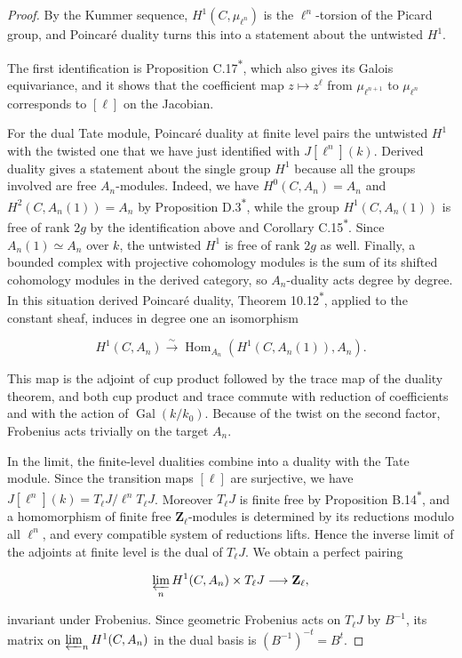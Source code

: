 \documentclass[11pt]{article}
\newcommand{\bpout}[1]{#1\textsuperscript{\hyperlink{bp-outside}{\ensuremath{\ast}}}}
\providecommand{\Hom}{}\renewcommand{\Hom}{\operatorname{Hom}}
\begin{document}
\begin{proof}[{Proof}]\label{bp49}%
By the Kummer sequence, \(H^1(C,\mu_{\ell^n})\) is the \(\ell^n\)-torsion of the Picard group, and Poincaré duality turns this into a statement about the untwisted \(H^1\).

The first identification is Proposition \bpout{C.17}, which also gives its Galois equivariance, and it shows that the coefficient map \(z\mapsto z^\ell\) from \(\mu_{\ell^{n+1}}\) to \(\mu_{\ell^n}\) corresponds to \([\ell]\) on the Jacobian.

For the dual Tate module, Poincaré duality at finite level pairs the untwisted \(H^1\) with the twisted one that we have just identified with \(J[\ell^n](k)\). Derived duality gives a statement about the single group \(H^1\) because all the groups involved are free \(A_n\)-modules. Indeed, we have \(H^0(C,A_n)=A_n\) and \(H^2(C,A_n(1))=A_n\) by Proposition \bpout{D.3}, while the group \(H^1(C,A_n(1))\) is free of rank \(2g\) by the identification above and Corollary \bpout{C.15}. Since \(A_n(1)\simeq A_n\) over \(k\), the untwisted \(H^1\) is free of rank \(2g\) as well. Finally, a bounded complex with projective cohomology modules is the sum of its shifted cohomology modules in the derived category, so \(A_n\)-duality acts degree by degree. In this situation derived Poincaré duality, Theorem \bpout{10.12}, applied to the constant sheaf, induces in degree one an isomorphism

\[
H^1(C,A_n)\xrightarrow{\sim}
\Hom_{A_n}(H^1(C,A_n(1)),A_n).
\]

This map is the adjoint of cup product followed by the trace map of the duality theorem, and both cup product and trace commute with reduction of coefficients and with the action of \(\operatorname{Gal}(k/k_0)\).  Because of the twist on the second factor, Frobenius acts trivially on the target \(A_n\).

In the limit, the finite-level dualities combine into a duality with the Tate module. Since the transition maps \([\ell]\) are surjective, we have \(J[\ell^n](k)=T_\ell J/\ell^nT_\ell J\). Moreover \(T_\ell J\) is finite free by Proposition \bpout{B.14}, and a homomorphism of finite free \(\mathbf Z_\ell\)-modules is determined by its reductions modulo all \(\ell^n\), and every compatible system of reductions lifts. Hence the inverse limit of the adjoints at finite level is the dual of \(T_\ell J\). We obtain a perfect pairing

\[
\varprojlim_nH^1(C,A_n)\times T_\ell J\longrightarrow\mathbf Z_\ell,
\]

invariant under Frobenius.  Since geometric Frobenius acts on \(T_\ell J\) by \(B^{-1}\), its matrix on \(\varprojlim_nH^1(C,A_n)\) in the dual basis is \((B^{-1})^{-t}=B^t\).
\end{proof}
\end{document}
